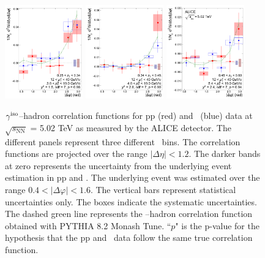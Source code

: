 \begin{figure}
    \includegraphics[width=0.3\textwidth]{Data_Analysis/gammahadron/Cs_Final_Indv_pT_0_zT_5.pdf}        
    \includegraphics[width=0.3\textwidth]{Data_Analysis/gammahadron/Cs_Final_Indv_pT_0_zT_6.pdf}        
    \includegraphics[width=0.3\textwidth]{Data_Analysis/gammahadron/Cs_Final_Indv_pT_0_zT_7.pdf}
    \caption{$\gamma^\mathrm{iso}$--hadron correlation functions for pp (red) and \pPb~(blue) data at $\sqrt{s_\mathrm{NN}}$ = 5.02 TeV as measured by the ALICE detector. The different panels represent three different \zt~bins. The correlation functions are projected over the range $|\Delta\eta| < 1.2$. The darker bands at zero represents the uncertainty from the underlying event estimation in pp and \pPb. The underlying event was estimated over the range $0.4 <|\Delta\varphi| < 1.6$. The vertical bars represent statistical uncertainties only. The boxes indicate the systematic uncertainties. The dashed green line represents the \gammaiso--hadron correlation function obtained with \textsc{PYTHIA 8.2} Monash Tune. ``$p$" is the p-value for the hypothesis that the pp and \pPb~data follow the same true correlation function.
    }
     \label{fig:GH_Correlations}
 \end{figure}

